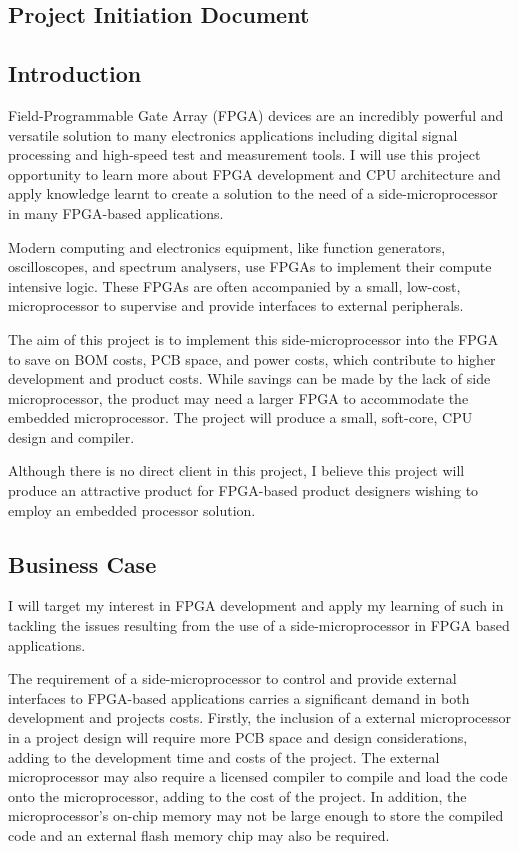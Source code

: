 
\subsection{Project Initiation Document}
\label{pid}
\subsection*{Introduction}
Field-Programmable Gate Array (FPGA) devices are an incredibly powerful and versatile solution to many electronics applications including digital signal processing and high-speed test and measurement tools. I will use this project opportunity to learn more about FPGA development and CPU architecture and apply knowledge learnt to create a solution to the need of a side-microprocessor in many FPGA-based applications.

Modern computing and electronics equipment, like function generators, oscilloscopes, and spectrum analysers, use FPGAs to implement their compute intensive logic. These FPGAs are often accompanied by a small, low-cost, microprocessor to supervise and provide interfaces to external peripherals.

The aim of this project is to implement this side-microprocessor into the FPGA to save on BOM costs, PCB space, and power costs, which contribute to higher development and product costs. While savings can be made by the lack of side microprocessor, the product may need a larger FPGA to accommodate the embedded microprocessor. The project will produce a small, soft-core, CPU design and compiler.

Although there is no direct client in this project, I believe this project will produce an attractive product for FPGA-based product designers wishing to employ an embedded processor solution.

\subsection*{Business Case}
I will target my interest in FPGA development and apply my learning of such in tackling the issues resulting from the use of a side-microprocessor in FPGA based applications.

The requirement of a side-microprocessor to control and provide external interfaces to FPGA-based applications carries a significant demand in both development and projects costs. Firstly, the inclusion of a external microprocessor in a project design will require more PCB space and design considerations, adding to the development time and costs of the project. The external microprocessor may also require a licensed compiler to compile and load the code onto the microprocessor, adding to the cost of the project. In addition, the  microprocessor's on-chip memory may not be large enough to store the compiled code and an external flash memory chip may also be required.

